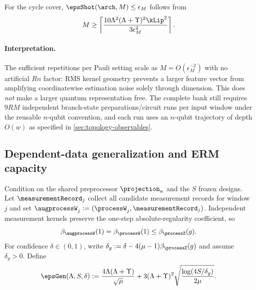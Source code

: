 \begin{corollary}
\label{cor:measurement-budget-calibration}
For the cycle cover, $\epsShot(\arch,M)\leq\epsilon_M$ follows from
\begin{equation}
    M\geq
    \left\lceil
      \frac{10\Lambda^2(\Lambda+\Upsilon)^2\kLip^2}{3\epsilon_M^2}
    \right\rceil.
    \label{eq:risk-measurement-budget}
\end{equation}
\end{corollary}

\paragraph{Interpretation.}
The sufficient repetitions per Pauli setting scale as
$M=O(\epsilon_M^{-2})$ with no artificial $Rn$ factor: RMS kernel geometry
prevents a larger feature vector from amplifying coordinatewise estimation
noise solely through dimension.  This does \emph{not} make a larger quantum
representation free.  The complete bank still requires $9RM$ independent
branch-state preparations/circuit runs per input window under the reusable
$n$-qubit convention, and each run uses an $n$-qubit trajectory of depth
$O(w)$ as specified in \cref{sec:topology-observables}.

\subsection{Dependent-data generalization and ERM capacity}
\label{sec:dependent-generalization}
\label{sec:dependent-penalty}

Condition on the shared preprocessor $\projection_n$ and the $S$ frozen
designs.  Let $\measurementRecord_j$ collect all candidate measurement records
for window $j$ and set
$\augprocessW_j:=(\processW_j,\measurementRecord_j)$.  Independent measurement
kernels preserve the one-step absolute-regularity coefficient, so
\begin{equation}
    \beta_{\augprocessW}(1)=\beta_{\processW}(1)
    \leq\beta_{\processZ}(g).
    \label{eq:augmented-window-mixing}
\end{equation}
For confidence $\delta\in(0,1)$, write
$\delta_g:=\delta-4(\mu-1)\beta_{\processZ}(g)$ and assume $\delta_g>0$.
Define
\begin{equation}
    \epsGen(\Lambda,S,\delta)
    :=\frac{4\Lambda(\Lambda+\Upsilon)}{\sqrt\mu}
      +3(\Lambda+\Upsilon)^2
       \sqrt{\frac{\log(4S/\delta_g)}{2\mu}}.
    \label{eq:dependent-certificate}
\end{equation}

